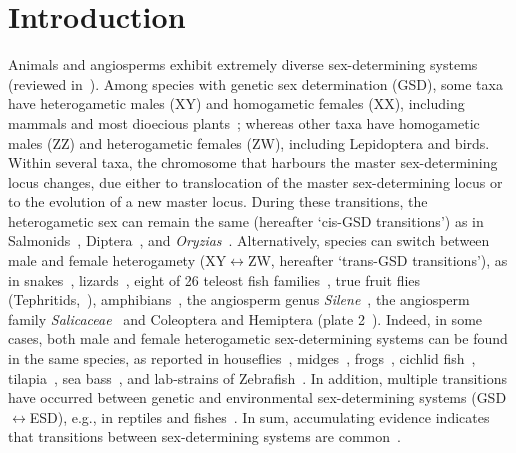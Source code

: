 \documentclass[10pt,letterpaper]{article}
\begin{document}
\section*{Introduction}
Animals and angiosperms exhibit extremely diverse sex-determining systems (reviewed in~\cite{Bull:1983vi,Charlesworth:2010it,Beukeboom:2014vb,Bachtrog:2014bx, Pennell2018}). 
Among species with genetic sex determination (GSD), some taxa have heterogametic males (XY) and homogametic females (XX), including %
mammals and most dioecious plants~\cite{Ming:2011iy}; whereas other taxa have homogametic males (ZZ) and heterogametic females (ZW), including Lepidoptera and birds. 
Within several taxa, the chromosome that harbours the master sex-determining locus changes, due either to translocation of the master sex-determining locus or to the evolution of a new master locus.  
During these transitions, the heterogametic sex can remain the same (hereafter `cis-GSD transitions') as in Salmonids~\cite{Li:2011fm,Yano:2012di}, Diptera~\cite{Vicoso:2015hf}, and \textit{Oryzias}~\cite{Myosho:2012fv}. 
Alternatively, species can switch between male and female heterogamety (XY$\leftrightarrow$ZW, hereafter `trans-GSD transitions'), as in snakes~\cite{Gamble2017}, lizards~\cite{Ezaz:2009tk}, eight of 26 teleost fish families~\cite{Mank:2006bt}, true fruit flies (Tephritids,~\cite{Vicoso:2015hf}), amphibians~\cite{Hillis:1990gu}, the angiosperm genus \textit{Silene}~\cite{Slancarova:2013dq}, the angiosperm family \textit{Salicaceae}~\cite{Pucholt2015,Pucholt2017} and Coleoptera and Hemiptera (plate 2~\cite{Beukeboom:2014vb}).
Indeed, in some cases, both male and female heterogametic sex-determining systems can be found in the same species, as reported in houseflies~\cite{Macdonald1978}, midges~\cite{Thompson1971}, frogs~\cite{Ogata:2007jm}, cichlid fish~\cite{Ser:2010iq}, tilapia~\cite{Lee2004}, sea bass~\cite{Vandeputte2007}, and lab-strains of Zebrafish~\cite{Liew2012,Wilson2014}.
In addition, multiple transitions have occurred between genetic and environmental sex-determining systems (GSD$\leftrightarrow$ESD), e.g., in reptiles and fishes~\cite{Conover:1987in,Mank:2006bt,Pokorna:2009ui,Ezaz:2009tk,Pen:2010kk,Holleley:2015hc, Pennell2018}.
In sum, accumulating evidence indicates that transitions between sex-determining systems are common~\cite{Bachtrog:2014bx}.
\end{document}
